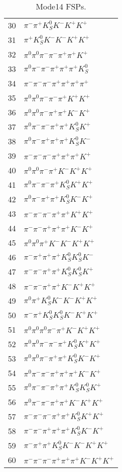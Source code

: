 \begin{table}[h!]
\begin{center}
\begin{tabular}{cl}
30 & $\pi^- \pi^+ K_S^0 K^- K^+ K^+ $ \\
31 & $\pi^+ K_S^0 K^- K^- K^+ K^+ $ \\
32 & $\pi^0 \pi^0 \pi^- \pi^- \pi^+ \pi^+ K^+ $ \\
33 & $\pi^0 \pi^- \pi^- \pi^+ \pi^+ \pi^+ K_S^0 $ \\
34 & $\pi^- \pi^- \pi^- \pi^+ \pi^+ \pi^+ \pi^+ $ \\
35 & $\pi^0 \pi^0 \pi^- \pi^- \pi^+ K^+ K^+ $ \\
36 & $\pi^0 \pi^0 \pi^- \pi^+ \pi^+ K^- K^+ $ \\
37 & $\pi^0 \pi^- \pi^- \pi^+ \pi^+ K_S^0 K^+ $ \\
38 & $\pi^0 \pi^- \pi^+ \pi^+ \pi^+ K_S^0 K^- $ \\
39 & $\pi^- \pi^- \pi^- \pi^+ \pi^+ \pi^+ K^+ $ \\
40 & $\pi^0 \pi^0 \pi^- \pi^+ K^- K^+ K^+ $ \\
41 & $\pi^0 \pi^- \pi^- \pi^+ K_S^0 K^+ K^+ $ \\
42 & $\pi^0 \pi^- \pi^+ \pi^+ K_S^0 K^- K^+ $ \\
43 & $\pi^- \pi^- \pi^- \pi^+ \pi^+ K^+ K^+ $ \\
44 & $\pi^- \pi^- \pi^+ \pi^+ \pi^+ K^- K^+ $ \\
45 & $\pi^0 \pi^0 \pi^+ K^- K^- K^+ K^+ $ \\
46 & $\pi^- \pi^+ \pi^+ \pi^+ K_S^0 K_S^0 K^- $ \\
47 & $\pi^- \pi^- \pi^+ \pi^+ K_S^0 K_S^0 K^+ $ \\
48 & $\pi^- \pi^- \pi^+ \pi^+ K^- K^+ K^+ $ \\
49 & $\pi^0 \pi^+ K_S^0 K^- K^- K^+ K^+ $ \\
50 & $\pi^- \pi^+ K_S^0 K_S^0 K^- K^+ K^+ $ \\
51 & $\pi^0 \pi^0 \pi^0 \pi^- \pi^+ K^- K^+ K^+ $ \\
52 & $\pi^0 \pi^0 \pi^- \pi^- \pi^+ K_S^0 K^+ K^+ $ \\
53 & $\pi^0 \pi^0 \pi^- \pi^+ \pi^+ K_S^0 K^- K^+ $ \\
54 & $\pi^0 \pi^- \pi^- \pi^+ \pi^+ \pi^+ K^- K^+ $ \\
55 & $\pi^0 \pi^- \pi^- \pi^+ \pi^+ K_S^0 K_S^0 K^+ $ \\
56 & $\pi^0 \pi^- \pi^- \pi^+ \pi^+ K^- K^+ K^+ $ \\
57 & $\pi^- \pi^- \pi^- \pi^+ \pi^+ K_S^0 K^+ K^+ $ \\
58 & $\pi^- \pi^- \pi^+ \pi^+ \pi^+ K_S^0 K^- K^+ $ \\
59 & $\pi^- \pi^+ \pi^+ K_S^0 K^- K^- K^+ K^+ $ \\
60 & $\pi^- \pi^- \pi^- \pi^+ \pi^+ \pi^+ K^- K^+ K^+ $ \\
\hline
\end{tabular}
\label{tab:Mode14FSPs}
\caption{Mode14 FSPs.}
\end{center}
\end{table}
